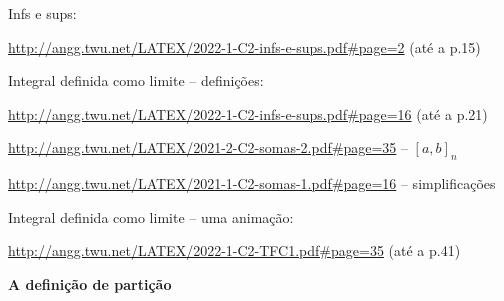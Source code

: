 \documentclass[oneside,12pt]{article}
\begin{document}
\ssk


Infs e sups:

{\scriptsize

\url{http://angg.twu.net/LATEX/2022-1-C2-infs-e-sups.pdf\#page=2} (até a p.15)

}

\ssk

Integral definida como limite -- definições:

{\scriptsize

\url{http://angg.twu.net/LATEX/2022-1-C2-infs-e-sups.pdf\#page=16} (até a p.21)

\url{http://angg.twu.net/LATEX/2021-2-C2-somas-2.pdf\#page=35} -- $[a,b]_n$

\url{http://angg.twu.net/LATEX/2021-1-C2-somas-1.pdf\#page=16} -- simplificações

}

\ssk

Integral definida como limite -- uma animação:

{\scriptsize

\url{http://angg.twu.net/LATEX/2022-1-C2-TFC1.pdf\#page=35} (até a p.41)

}



\newpage


{\bf A definição de partição}
\end{document}
